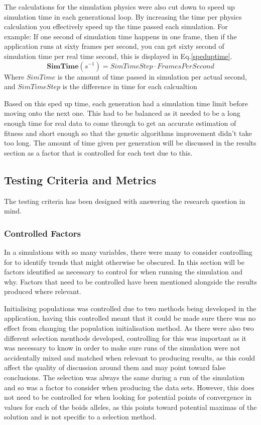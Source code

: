 The calculations for the simulation physics were also cut down to speed up simulation time in each generational loop. By increasing the time per physics calculation you effectively speed up the time passed each simulation. For example: If one second of simulation time happens in one frame, then if the application runs at sixty frames per second, you can get sixty second of simulation time per real time second, this is displayed in Eq.\ref{speduptime}.
\begin{equation}
	\boldsymbol{SimTime}(s^{-1}) = SimTimeStep \cdot FramesPerSecond
	\label{speduptime}
\end{equation}
Where $SimTime$ is the amount of time passed in simulation per actual second, and $SimTimeStep$ is the difference in time for each calcualtion

Based on this sped up time, each generation had a simulation time limit before moving onto the next one. This had to be balanced as it needed to be a long enough time for real data to come through to get an accurate estimation of fitness and short enough so that the genetic algorithms improvement didn't take too long. The amount of time given per generation will be discussed in the results section as a factor that is controlled for each test due to this.


\subsection{Testing Criteria and Metrics}
The testing criteria has been designed with answering the research question in mind. 

\subsubsection{Controlled Factors}
In a simulations with so many variables, there were many to consider controlling for to identify trends that might otherwise be obscured. In this section will be factors identified as necessary to control for when running the simulation and why. Factors that need to be controlled have been mentioned alongside the results produced where relevant.

Initialising populations was controlled due to two methods being developed in the application, having this controlled meant that it could be made sure there was no effect from changing the population initialisation method. As there were also two different selection menthods developed, controlling for this was important as it was necessary to know in order to make sure runs of the simulation were not accidentally mixed and matched when relevant to producing results, as this could affect the quality of discussion around them and may point toward false conclusions. The selection was always the same during a run of the simulation and so was a factor to consider when producing the data sets. However, this does not need to be controlled for when looking for potential points of convergence in values for each of the boids alleles, as this points toward potential maximas of the solution and is not specific to a selection method.


